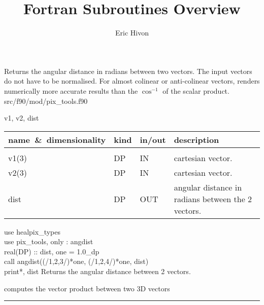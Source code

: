 
\sloppy


\title{\healpix Fortran Subroutines Overview}
 \section[angdist]{ }
\label{sub:angdist}
\author{Eric Hivon}

\begin{facility}
{Returns the angular distance in radians between two vectors. The input vectors
do not have to be normalised. For almost colinear or anti-colinear vectors, renders
numerically more accurate results than the $\cos^{-1}$ of the scalar product.} 
{src/f90/mod/pix\_tools.f90}
\end{facility}

\begin{f90format}
{v1, v2, dist}
\end{f90format}

\begin{arguments}
{
\begin{tabular}{p{0.25\hsize} p{0.05\hsize} p{0.1\hsize} p{0.5\hsize}} \hline 
\textbf{name~\&~dimensionality} & \textbf{kind} & \textbf{in/out} & \textbf{description} \\ \hline
                   &   &   &                           \\ %
v1(3) & DP & IN & cartesian vector. \\
v2(3) & DP & IN & cartesian vector. \\
dist & DP & OUT & angular distance in radians between the 2 vectors.
\end{tabular}
}
\end{arguments}

\begin{example}
{
use healpix\_types \\
use pix\_tools,    only : angdist \\
real(DP) :: dist, one = 1.0\_dp \\
call angdist((/1,2,3/)*one, (/1,2,4/)*one, dist)  \\
print*, dist
}
{
Returns the angular distance between 2 vectors.
}
\end{example}

\begin{related}
  \begin{sulist}{} %
  \item[\htmlref{vect\_prod}{sub:vect_prod}] computes the vector product between two 3D vectors
  \end{sulist}
\end{related}

\rule{\hsize}{2mm}

\newpage
